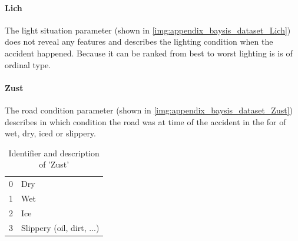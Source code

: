\documentclass[a4paper,headsepline,footsepline,fontsize=11pt,BCOR=12mm,DIV=12]{report}
\begin{document}
\paragraph{Lich}
The light situation parameter (shown in \ref{img:appendix_baysis_dataset_Lich}) does not reveal any features and describes the lighting condition when the accident happened. Because it can be ranked from best to worst lighting is is of ordinal type.

\paragraph{Zust}
The road condition parameter (shown in \ref{img:appendix_baysis_dataset_Zust}) describes in which condition the road was at time of the accident in the for of wet, dry, iced or slippery.
\noindent
\begin{table}[h!]
	\centering
	\begin{tabular}{c|l}  
		0 & Dry \\ 
 		1 & Wet \\ 
 		2 & Ice \\
 		3 & Slippery (oil, dirt, ...)  \\
	\end{tabular}
	\caption{Identifier and description of 'Zust'}
	\label{table:baysis_dataset_Zust}
\end{table}
\end{document}
